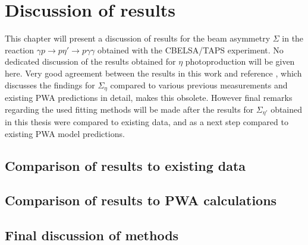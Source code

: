 \chapter{Discussion of results}
This chapter will present a discussion of results for the beam asymmetry $\Sigma$ in the reaction $\gamma p \to p\eta'\to p\gamma\gamma$ obtained with the CBELSA/TAPS experiment. No dedicated discussion of the results obtained for $\eta$ photoproduction will be given here. Very good agreement between the results in this work and reference \cite{farahphd}, which discusses the findings for $\Sigma_\eta$ compared to various previous measurements and existing PWA predictions in detail, makes this obsolete. However final remarks regarding the used fitting methods will be made after the results for $\Sigma_{\eta'}$ obtained in this thesis were compared to existing data, and as a next step compared to existing PWA model predictions. 
\section{Comparison of results to existing data}

\section{Comparison of results to PWA calculations}

\section{Final discussion of methods}
